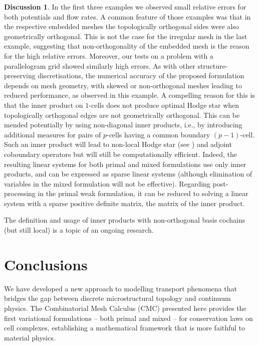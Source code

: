 \documentclass{elsarticle}
\theoremstyle{definition}
\newtheorem{discussion}[theorem]{Discussion}
\begin{document}
\begin{discussion}
  In the first three examples we observed small relative errors for both potentials and flow rates.
  A common feature of those examples was that in the respective embedded meshes the topologically orthogonal sides were also geometrically orthogonal. This is not the case for the irregular mesh in the last example, suggesting that non-orthogonality of the embedded mesh is the reason for the high relative errors. Moreover, our tests on a problem with a parallelogram grid showed similarly high errors.
  As with other structure-preserving discretisations, the numerical accuracy of
  the proposed formulation depends on mesh geometry, with skewed or
  non-orthogonal meshes leading to reduced performance, as observed in this
  example.
  A compelling reason for this is that the inner product on $1$-cells does not produce optimal Hodge star when topologically orthogonal edges are not geometrically orthogonal.
  This can be mended potentially by using non-diagonal inner products, i.e., by introducing additional measures for pairs of $p$-cells having a common boundary $(p-1)$-cell.
  Such an inner product will lead to non-local Hodge star (see \cite[Section 8]{wilson2007cochain}) and adjoint coboundary operators but will still be computationally efficient.
  Indeed, the resulting linear systems for both primal and mixed formulations use only inner products, and can be expressed as sparse linear systems (although elimination of variables in the mixed formulation will not be effective).
  Regarding post-processing in the primal weak formulation, it can be reduced to solving a linear system with a sparse positive definite matrix, the matrix of the inner product.

  The definition and usage of inner products with non-orthogonal basis cochains (but still local) is a topic of an ongoing research.
\end{discussion}

\section{Conclusions}

We have developed a new approach to modelling transport phenomena that bridges the gap between discrete microstructural topology and continuum physics. The Combinatorial Mesh Calculus (CMC) presented here provides the first variational formulations -- both primal and mixed -- for conservation laws on cell complexes, establishing a mathematical framework that is more faithful to material physics.
\end{document}
